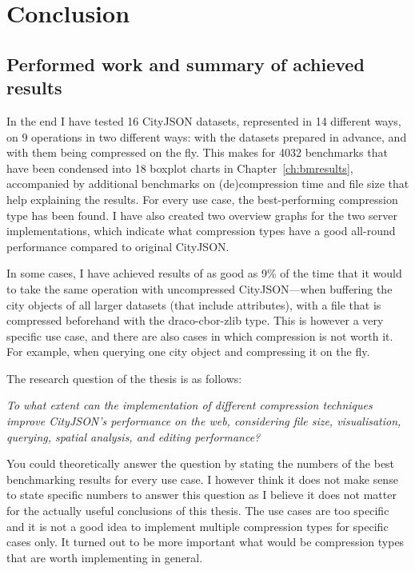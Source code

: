 \chapter{Conclusion}
\label{ch:conclusion}

\section{Performed work and summary of achieved results}

In the end I have tested 16 CityJSON datasets, represented in 14 different ways, on 9 operations in two different ways: with the datasets prepared in advance, and with them being compressed on the fly.
This makes for 4032 benchmarks that have been condensed into 18 boxplot charts in Chapter~\ref{ch:bmresults}, accompanied by additional benchmarks on (de)compression time and file size that help explaining the results.
For every use case, the best-performing compression type has been found.
I have also created two overview graphs for the two server implementations, which indicate what compression types have a good all-round performance compared to original CityJSON.

In some cases, I have achieved results of as good as 9\% of the time that it would to take the same operation with uncompressed CityJSON---when buffering the city objects of all larger datasets (that include attributes), with a file that is compressed beforehand with the draco-cbor-zlib type.
This is however a very specific use case, and there are also cases in which compression is not worth it.
For example, when querying one city object and compressing it on the fly.

The research question of the thesis is as follows:

\textit{To what extent can the implementation of different compression techniques improve CityJSON’s performance on the web, considering file size, visualisation, querying, spatial analysis, and editing performance?}

You could theoretically answer the question by stating the numbers of the best benchmarking results for every use case.
I however think it does not make sense to state specific numbers to answer this question as I believe it does not matter for the actually useful conclusions of this thesis.
The use cases are too specific and it is not a good idea to implement multiple compression types for specific cases only.
It turned out to be more important what would be compression types that are worth implementing in general.



